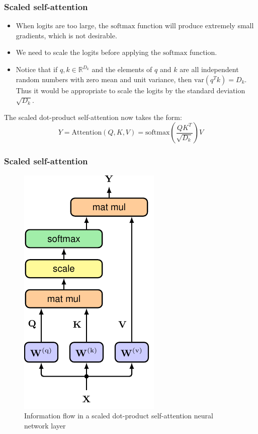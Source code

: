 \documentclass{beamer}
\begin{document}
\begin{frame}
    \frametitle{Scaled self-attention}
    \begin{itemize}
        \item When logits are too large, the $\mathrm{softmax}$ function will produce extremely small gradients, which is not desirable.
        \item We need to scale the logits before applying the $\mathrm{softmax}$ function.
        \item Notice that if $q,k\in\mathbb{R}^{D_{k}}$ and the elements of $q$ and $k$ are all independent random numbers with zero mean and unit variance, then $\mathrm{var}(q^{T}k)=D_{k}$. Thus it would be appropriate to scale the logits by the standard deviation $\sqrt{D_{k}}$.
    \end{itemize}
    The scaled dot-product self-attention now takes the form:
    \begin{equation*}
        Y=\mathrm{Attention}(Q,K,V)=\mathrm{softmax}(\frac{QK^{T}}{\sqrt{D_{k}}})V
    \end{equation*}
\end{frame}

\begin{frame}
    \frametitle{Scaled self-attention}
    \begin{figure}
        \caption{Information flow in a scaled dot-product self-attention neural network layer}
        \includegraphics[height=0.7\textheight]{Figure_6.pdf}
    \end{figure}
\end{frame}
\end{document}
